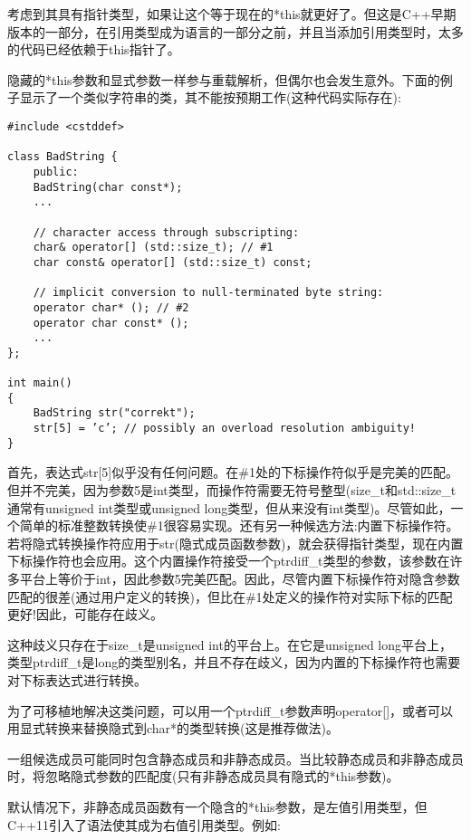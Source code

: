 考虑到其具有指针类型，如果让这个等于现在的*this就更好了。但这是C++早期版本的一部分，在引用类型成为语言的一部分之前，并且当添加引用类型时，太多的代码已经依赖于this指针了。

隐藏的*this参数和显式参数一样参与重载解析，但偶尔也会发生意外。下面的例子显示了一个类似字符串的类，其不能按预期工作(这种代码实际存在):

\begin{lstlisting}[style=styleCXX]
#include <cstddef>

class BadString {
	public:
	BadString(char const*);
	...
	
	// character access through subscripting:
	char& operator[] (std::size_t); // #1
	char const& operator[] (std::size_t) const;
	
	// implicit conversion to null-terminated byte string:
	operator char* (); // #2
	operator char const* ();
	...
};

int main()
{
	BadString str("correkt");
	str[5] = ’c’; // possibly an overload resolution ambiguity!
}
\end{lstlisting}

首先，表达式str[5]似乎没有任何问题。在\#1处的下标操作符似乎是完美的匹配。但并不完美，因为参数5是int类型，而操作符需要无符号整型(size\_t和std::size\_t通常有unsigned int类型或unsigned long类型，但从来没有int类型)。尽管如此，一个简单的标准整数转换使\#1很容易实现。还有另一种候选方法:内置下标操作符。若将隐式转换操作符应用于str(隐式成员函数参数)，就会获得指针类型，现在内置下标操作符也会应用。这个内置操作符接受一个ptrdiff\_t类型的参数，该参数在许多平台上等价于int，因此参数5完美匹配。因此，尽管内置下标操作符对隐含参数匹配的很差(通过用户定义的转换)，但比在\#1处定义的操作符对实际下标的匹配更好!因此，可能存在歧义。

\begin{tcolorbox}[colback=webgreen!5!white,colframe=webgreen!75!black]
\hspace*{0.75cm}这种歧义只存在于size\_t是unsigned int的平台上。在它是unsigned long平台上，类型ptrdiff\_t是long的类型别名，并且不存在歧义，因为内置的下标操作符也需要对下标表达式进行转换。
\end{tcolorbox}

为了可移植地解决这类问题，可以用一个ptrdiff\_t参数声明operator[]，或者可以用显式转换来替换隐式到char*的类型转换(这是推荐做法)。

一组候选成员可能同时包含静态成员和非静态成员。当比较静态成员和非静态成员时，将忽略隐式参数的匹配度(只有非静态成员具有隐式的*this参数)。

默认情况下，非静态成员函数有一个隐含的*this参数，是左值引用类型，但C++11引入了语法使其成为右值引用类型。例如:

